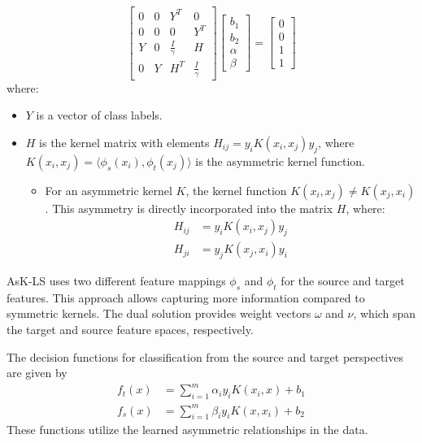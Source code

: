 \[
\begin{bmatrix}
0 & 0 & Y^T & 0 \\
0 & 0 & 0 & Y^T \\
Y & 0 & \frac{I}{\gamma} & H \\
0 & Y & H^T & \frac{I}{\gamma}
\end{bmatrix}
\begin{bmatrix}
b_1 \\
b_2 \\
\alpha \\
\beta
\end{bmatrix}
=
\begin{bmatrix}
0 \\
0 \\
1 \\
1
\end{bmatrix}
\]
where:
\begin{itemize}
	\item \( Y \) is a vector of class labels.
	\item \( H \) is the kernel matrix with elements \( H_{ij} = y_i K(x_i, x_j) y_j \), where \( K(x_i, x_j) = \langle \phi_s(x_i), \phi_t(x_j) \rangle \) is the asymmetric kernel function.
		\begin{itemize}
			\item For an asymmetric kernel \( K \), the kernel function \( K(x_i, x_j) \neq K(x_j, x_i) \). This asymmetry is directly incorporated into the matrix \( H \), where:
				\begin{align*}
					H_{ij} &= y_i K(x_i, x_j) y_j \\
					H_{ji} &= y_j K(x_j, x_i) y_i
				\end{align*}
		\end{itemize}
\end{itemize}

AsK-LS uses two different feature mappings \( \phi_s \) and \( \phi_t \) for the source and target features. This approach allows capturing more information compared to symmetric kernels. The dual solution provides weight vectors \( \omega \) and \( \nu \), which span the target and source feature spaces, respectively.

The decision functions for classification from the source and target perspectives are given by
\begin{align*}
	f_t(x) &= \sum_{i=1}^m \alpha_i y_i K(x_i, x) + b_1\\
	f_s(x) &= \sum_{i=1}^m \beta_i y_i K(x, x_i) + b_2
\end{align*}
These functions utilize the learned asymmetric relationships in the data.



